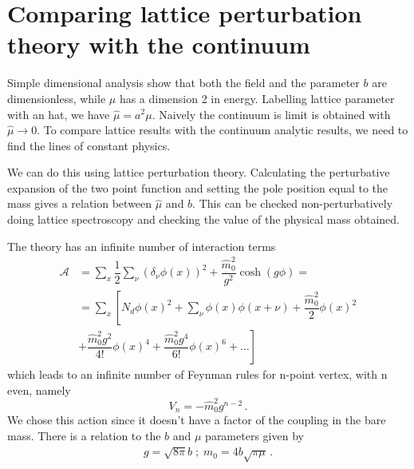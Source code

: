 \documentclass[12pt,a4paper]{report}
\begin{document}
\chapter{Comparing lattice perturbation theory with the continuum }
\label{sec:lattice_pt}
Simple dimensional analysis show that both the field and the parameter $b$ are dimensionless, while $\mu$ has a dimension 2 in energy. Labelling lattice parameter with an hat, we have $\hat \mu = a^2 \mu$. Naively the continuum is limit is obtained  with $\hat \mu \to 0$. To compare lattice results with the continuum analytic results, we need to find the lines of constant physics.

We can do this using lattice perturbation theory. Calculating the perturbative expansion of the two point function and setting the pole position equal to the mass gives a relation between $ \hat \mu$ and $ b$. This can be checked non-perturbatively doing lattice spectroscopy and checking the value of the physical mass obtained.

The theory has an infinite number of interaction terms \begin{align}
\mathcal{A} &= \sum_x \dfrac{1}{2} \sum_\nu  (\delta_\nu \phi(x))^2 + \dfrac{\hat m_0^2}{g^2} \cosh(g \phi) =\\
  &= \sum_x \left[ N_d \phi(x)^2 +  \sum_\nu \phi(x) \phi(x+\nu) +  \dfrac{\hat m_0^2 }{2}\phi(x)^2 \right. \nonumber \\
  &\left. +   \dfrac{ \hat m_0^2 g^2}{4!} \phi(x)^4 +  \dfrac{ \hat m_0^2 g^4}{6!} \phi(x)^6 + \dots  \right]
\end{align} which leads to an infinite number of Feynman rules for n-point vertex, with n even, namely \begin{equation}
V_n = - \hat m_0^2 g^{n-2} \,.
\end{equation} We chose this action since it doesn't have a factor of the coupling in the bare mass. There is a relation to the $b$ and $\mu$  parameters given by \begin{align}
g = \sqrt{8 \pi} b \; ; \; m_0 = 4 b \sqrt{\pi \mu} \,.
\end{align}
 
\end{document}
